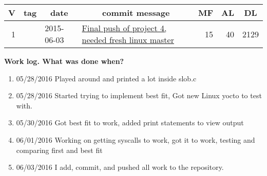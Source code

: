 \documentclass[letterpaper,10pt,titlepage,fleqn]{article}
\begin{document}
\bigskip

\noindent
\begin{tabular}{|rllp{7.5cm}rrr|}
\hline \multicolumn{1}{|c}{\textbf{V}} & \multicolumn{1}{c}{\textbf{tag}}
& \multicolumn{1}{c}{\textbf{date}}
& \multicolumn{1}{c}{\textbf{commit message}} & \multicolumn{1}{c}{\textbf{MF}}
& \multicolumn{1}{c}{\textbf{AL}} & \multicolumn{1}{c|}{\textbf{DL}} \\ \hline

\hline 1 &  & 2015-06-03 & \href{https://github.com/umagatl/cs444-135/commit/aa27c2eda9a1fddda999209345e83fa7379b7a2f} {Final push of project 4, needed fresh linux
 master} & 15 & 40 & 2129 
\\
\hline
\end{tabular}

\textbf{Work log. What was done when?}
\begin{enumerate}
\item 05/28/2016 Played around and printed a lot inside slob.c
\item 05/28/2016 Started trying to implement best fit, Got new Linux yocto to test with.
\item 05/30/2016 Got best fit to work, added print statements to view output
\item 06/01/2016 Working on getting syscalls to work, got it to work, testing and comparing first and best fit
\item 06/03/2016 I add, commit, and pushed all work to the repository.
\end{enumerate}
\end{document}
